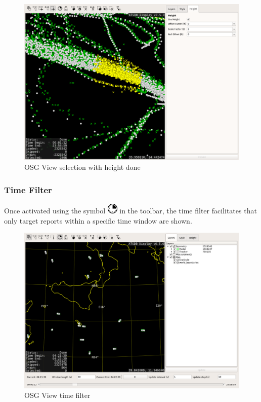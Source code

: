 \begin{figure}[H]
    \hspace*{-2.5cm}
    \includegraphics[width=19cm,frame]{../screenshots/osgview_select3d_2.png}
  \caption{OSG View selection with height done}
\end{figure}


\subsubsection{Time Filter}

Once activated using the symbol \includegraphics[width=0.5cm,frame]{../../data/icons/time.png} in the toolbar, the time filter facilitates that only target reports within a specific time window are shown.


\begin{figure}[H]
    \hspace*{-2.5cm}
    \includegraphics[width=19cm,frame]{../screenshots/osgview_time_filter.png}
  \caption{OSG View time filter}
  \label{fig:osgview_time_filter}
\end{figure}


